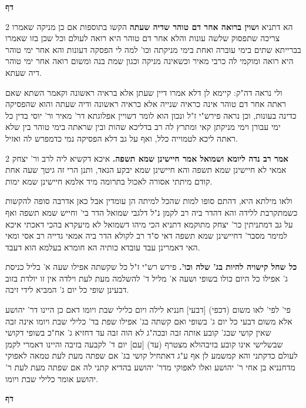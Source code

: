 \documentclass[12pt, openany]{book}
\newcommand{\sethebfont}{
\fontsize{10.5pt}{21.0pt} \selectfont
}
\newcommand{\twocol}[1]{
	{\sethebfont \begin{multicols}{2}
			#1
	\end{multicols}}	
}
\newcommand{\chapname}{}
\newcommand{\newchap}[1]{
	\addcontentsline{toc}{chapter}{#1}
	\renewcommand{\chapname}{#1}
		\begin{center}
			\textbf{%
\fontsize{16pt}{16pt}\selectfont
				#1}
		\end{center}
}
\begin{document}
\newchap{דף }
\twocol{הא דתניא \textbf{ושוין ברואה אחר דם טוהר שדיה שעתה}  הקשו בתוספות אם כן מניקה שאמרו צריכה שתפסוק שלשה עונות והלא אחר דם טוהר היא רואה לעולם וכל שכן בזו שאמרו בברייתא שתים בימי עוברה ואחת בימי מניקתה וכו' למה לי הפסקה דעונות והא אחר ימי טוהר היא רואה ומוקמי לה כרבי מאיר וכשאינה מניקה וכגון שמת בנה ומשום רואה אחר ימי טוהר דיה שעתא.\par  ולי נראה דה"ק: קיימא לן דלא אמרו דיין שעתן אלא בראיה ראשונה וקאמר השתא שאם ראתה אחר דם טוהר אינה כראיה שנייה אלא כראיה ראשונה ודיה שעתה והוא שהפסיקה כדינה בעונות, וכן נראה פירש"י ז"ל ונכון הוא לומר דשויין אפלוגתא דר' מאיר ור' יוסי בדין כל ימי עבורן וימי מניקתן קאי ומתרץ לה רב בדליכא שהות ובין שראתה בימי טוהר בין שלא ראתה ליכא לטמוייה כלל, ואף על גב דלא הפסיקה נמי כדמפרש לה ואזיל. 
\par}
\twocol{\textbf{אמר רב נדה ליומא ושמואל אמר חיישינן שמא תשפה.}  איכא דקשיא ליה לרב ור' יצחק אמאי לא חיישינן שמא תשפה והא חיישינן שמא יבקע הנאד, ותנן הרי זה גיטך שעה אחת קודם מיתתי אסורה לאכול בתרומה מיד אלמא חיישינן שמא ימות.\par ולאו מילתא היא, דהתם סופו למות שהכל למיתה הן עומדין אבל כאן אדרבה סופה להקשות כשמתקרבת ללידה והא דהדר ביה רב לקמן נ"ל דלגבי שמואל הדר בי' וחייש שמא תשפה ואף על גב דמתניתין כר' יצחק מתוקמא דתניא הכי מיהו דשמואל לא מיעקרא בהכי דאכתי איכא למימר מסבר' דחיישינן שמא תשפה דאי ס"ד רב לקולא הדר ביה אמאי גדייה רב אסי ומאי האי דאמרינן עבד עובדא כותיה הא חומרא בעלמא הוא דעבד. 
\par\textbf{כל שחל קישויה להיות בג' שלה וכו'.}  פירש רש"י ז"ל כל שקשתה אפילו שעה א' בליל כניסת ג' אפילו כל היום כולו בשופי ושעה א' מליל ד' להשלמה מעת לעת וילדה אין זו יולדת בזוב דבעינן שופי כל יום ג' המביא לידי זיבה.\par  פי' לפי' לאו משום (דכפי) [דבעי] חנניא לילה ויום כלילי שבת ויומו דאם כן היינו דר' יהושע אלא משום דבעי כל יום ג' בשופי ואם קשתה בג' אפילו שפת בד' כלילי שבת ויומו אינה זבה שאין קושי שבג' קובע אותה זבה ובכה"ג לא הוה זבה עד דחזיא ג' אח"כ בשופי דקושי שבשלישי אינו קובע בזיבהולא מצטרף (עד) [עם] יום ד' לקבעה בזיבה והיינו דאמרי לקמן לעולם כדקתני והא קמשמע לן אף ע"ג דאתחיל קושי בג' אם שפתה מעת לעת טמאה לאפוקי מדחנניא בן אחי ר' יהושע ואלו לאפוקי מדר' יהושע בהדיא קתני לה אם שפתה מעת לעת ר' יהושע אומר כלילי שבת ויומו. 
\par}
\newchap{דף }
\end{document}
